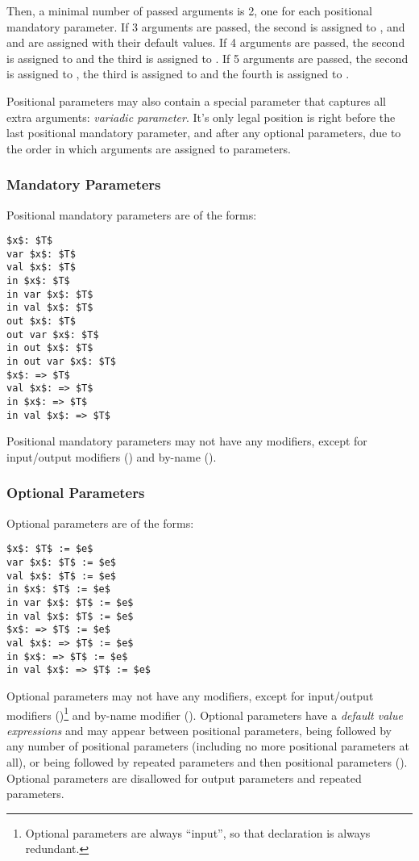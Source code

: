 Then, a minimal number of passed arguments is 2, one for each positional mandatory parameter. If 3 arguments are passed, the second is assigned to , and  and  are assigned with their default values. If 4 arguments are passed, the second is assigned to  and the third is assigned to . If 5 arguments are passed, the second is assigned to , the third is assigned to  and the fourth is assigned to .

Positional parameters may also contain a special parameter that captures all extra arguments: {\em variadic parameter}. It's only legal position is right before the last positional mandatory parameter, and after any optional parameters, due to the order in which arguments are assigned to parameters. 





\subsubsection{Mandatory Parameters}
\label{sec:mandatory-parameters}

Positional mandatory parameters are of the forms:
\begin{lstlisting}
$x$: $T$
var $x$: $T$
val $x$: $T$
in $x$: $T$
in var $x$: $T$
in val $x$: $T$
out $x$: $T$
out var $x$: $T$
in out $x$: $T$
in out var $x$: $T$
$x$: => $T$
val $x$: => $T$
in $x$: => $T$
in val $x$: => $T$
\end{lstlisting}

Positional mandatory parameters may not have any modifiers, except for input/output modifiers () and by-name (). 






\subsubsection{Optional Parameters}
\label{sec:optional-parameters}

Optional parameters are of the forms:
\begin{lstlisting}
$x$: $T$ := $e$
var $x$: $T$ := $e$
val $x$: $T$ := $e$
in $x$: $T$ := $e$
in var $x$: $T$ := $e$
in val $x$: $T$ := $e$
$x$: => $T$ := $e$
val $x$: => $T$ := $e$
in $x$: => $T$ := $e$
in val $x$: => $T$ := $e$
\end{lstlisting}

Optional parameters may not have any modifiers, except for input/output modifiers ()\footnote{Optional parameters are always ``input'', so that declaration is always redundant.} and by-name modifier (). Optional parameters have a {\em default value expressions} and may appear between positional parameters, being followed by any number of positional parameters (including no more positional parameters at all), or being followed by repeated parameters and then positional parameters (). Optional parameters are disallowed for output parameters and repeated parameters. 

